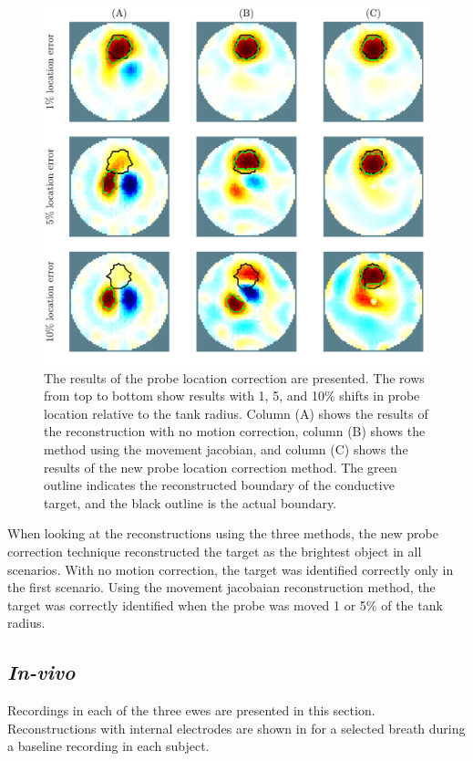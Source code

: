 \begin{figure}
    \centering
	\includegraphics[width=\textwidth]{chapter7-internal_elec_motion/imgs/recon_accuracy_hollow.pdf} 
	\caption[Results of the probe location correction]{\label{fig:probe_location_correction} 
	The results of the probe location correction are presented. 
	The rows from top to bottom show results with 1, 5, and 10\% shifts in probe location 
	relative to the tank radius.
	Column (A) shows the results of the reconstruction  with no motion correction,
	column (B) shows the method using the movement jacobian, and 
	column (C) shows the results of the new probe location correction method.
	The green outline indicates the reconstructed boundary of the conductive target, 
	and the black outline is the actual boundary.}
\end{figure}

When looking at the reconstructions using the three methods, the new probe correction technique
reconstructed the target as the brightest object in all scenarios. With no motion correction, the 
target was identified correctly only in the first scenario. Using the movement jacobaian 
reconstruction method, the target was correctly identified when the probe was moved 1 or 5\%
of the tank radius. 

\subsection{\emph{In-vivo}}
Recordings in each of the three ewes are presented in this section.
Reconstructions with internal electrodes are shown in
 for a selected breath during a 
baseline recording in each subject.

